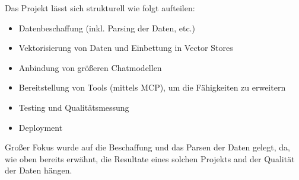 Das Projekt lässt sich strukturell wie folgt aufteilen:

\begin{itemize}
    \item Datenbeschaffung (inkl. Parsing der Daten, etc.)
    \item Vektorisierung von Daten und Einbettung in Vector Stores
    \item Anbindung von größeren Chatmodellen
    \item Bereitstellung von Tools (mittels MCP), um die Fähigkeiten zu erweitern
    \item Testing und Qualitätsmessung
    \item Deployment
\end{itemize}

Großer Fokus wurde auf die Beschaffung und das Parsen der Daten gelegt, da, wie oben bereits
erwähnt, die Resultate eines solchen Projekts and der Qualität der 
Daten hängen.